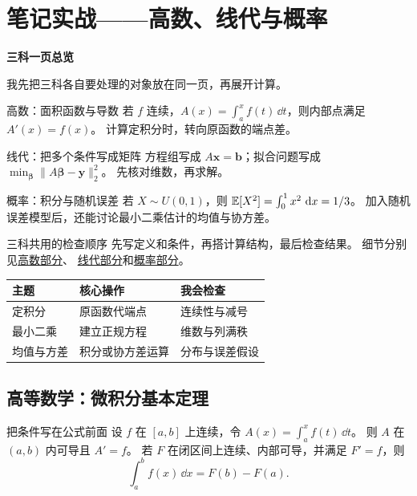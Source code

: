 \chapter{笔记实战——高数、线代与概率}
\noindent\textbf{三科一页总览}\par
我先把三科各自要处理的对象放在同一页，再展开计算。

\begin{conceptbox}{高数：面积函数与导数}
若 \(f\) 连续，\(A(x)=\int_a^x f(t)\,\dd t\)，则内部点满足 \(A'(x)=f(x)\)。
计算定积分时，转向原函数的端点差。
\end{conceptbox}
\begin{conceptbox}{线代：把多个条件写成矩阵}
方程组写成 \(A\bm{x}=\bm{b}\)；拟合问题写成
\(\min_{\bm{\beta}}\lVert A\bm{\beta}-\bm{y}\rVert_2^2\)。
先核对维数，再求解。
\end{conceptbox}
\begin{conceptbox}{概率：积分与随机误差}
若 \(X\sim U(0,1)\)，则 \(\mathbb{E}[X^2]=\int_0^1 x^2\,\mathop{}\!\mathrm{d} x=1/3\)。
加入随机误差模型后，还能讨论最小二乘估计的均值与协方差。
\end{conceptbox}
\begin{methodbox}{三科共用的检查顺序}
先写定义和条件，再搭计算结构，最后检查结果。
细节分别见\hyperref[ch:calculus]{高数部分}、
\hyperref[ch:linear]{线代部分}和\hyperref[ch:probability]{概率部分}。
\end{methodbox}
\begin{center}
\begin{tabular}{lll}
\toprule
主题 & 核心操作 & 我会检查 \\
\midrule
定积分 & 原函数代端点 & 连续性与减号 \\
最小二乘 & 建立正规方程 & 维数与列满秩 \\
均值与方差 & 积分或协方差运算 & 分布与误差假设 \\
\bottomrule
\end{tabular}
\end{center}

\clearpage
\section{高等数学：微积分基本定理}\label{ch:calculus}
\begin{conceptbox}{把条件写在公式前面}
设 \(f\) 在 \([a,b]\) 上连续，令 \(A(x)=\int_a^x f(t)\,\dd t\)。
则 \(A\) 在 \((a,b)\) 内可导且 \(A'=f\)。
若 \(F\) 在闭区间上连续、内部可导，并满足 \(F'=f\)，则
\begin{equation}\label{eq:ftc}
  \int_a^b f(x)\,\dd x=F(b)-F(a).
\end{equation}
\end{conceptbox}

